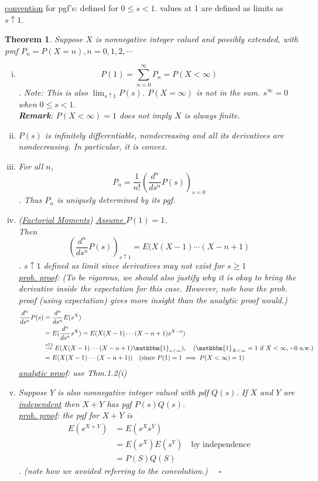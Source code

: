 \documentclass[12pt]{article}
\theoremstyle{definition}
\theoremstyle{plain}
\newtheorem{mythm}{Theorem}[section]
\begin{document}
\underline{convention} for pgf's: defined for $0 \leq s < 1$. values at 1 are defined as limits as $s \uparrow 1$.
\begin{mythm}
Suppose $X$ is nonnegative integer valued and possibly extended, with pmf $P_n = P(X=n),n=0,1,2,\cdots$
\begin{enumerate}[(i)]
\item \[P(1) = \sum_{n=0}^\infty P_n = P(X < \infty)\]. Note: This is also $\lim_{s \uparrow 1}P(s)$. $P(X = \infty)$ is not in the sum. $s^\infty = 0$ when $0 \leq s < 1$. \\
\textbf{Remark}: $P(X < \infty)=1$ does not imply $X$ is always finite.
\item $P(s)$ is infinitely differentiable, nondecreasing and all its derivatives are nondecreasing. In particular, it is convex.
\item For all $n$, \[P_n = \frac{1}{n!}(\frac{d^n}{ds^n}P(s))_{s=0}\]. Thus $P_n$ is uniquely determined by its pgf.
\item (\underline{Factorial Moments}) \underline{\underline{Assume $P(1)=1$}}. \\
Then \[(\frac{d^n}{ds^n}P(s))_{s\uparrow 1} = E(X(X-1)\cdots(X-n+1)\]. $s \uparrow 1$ defined as limit since derivatives may not exist for $s \geq 1$ \\
\underline{prob. proof}: (To be rigorous, we should also justify why it is okay to bring the derivative inside the expectation for this case. However, note how the prob. proof (using expectation) gives more insight than the analytic proof would.)
\begin{displaymath}
\begin{aligned}
\frac{d^n}{ds^n} P(s) &= \frac{d^n}{ds^n} E(s^X) \\
		&= E(\frac{d^n}{ds^n}s^X) = E(X(X-1)\cdots(X-n+1)s^{X-n}) \\
		&\stackrel{s\uparrow 1}{\rightarrow} E(X(X-1)\cdots(X-n+1)\mathbbm{1}_{x < \infty}),\quad \mbox{($\mathbbm{1}_{X < \infty} =1$ if $X < \infty, -0$ o.w.)} \\
		&=E(X(X-1)\cdots(X-n+1)) \quad \mbox{(since $P(1)=1 \implies P(X < \infty)=1$)}\\
\end{aligned}
\end{displaymath}
\underline{analytic proof}: use Thm.1.2(i)
\item Suppose $Y$ is also nonnegative integer valued with pdf $Q(s)$. If $X$ and $Y$ are \underline{\underline{independent}} then $X+Y$ has pgf $P(s)Q(s)$.\\
\underline{prob. proof}: the pgf for $X+Y$ is
\begin{displaymath}
\begin{aligned}
E(s^{X+Y}) &= E(s^Xs^Y)\\
	&= E(s^X)E(s^Y) \quad \mbox{by independence} \\
	&= P(S)Q(S) 
\end{aligned}
\end{displaymath}. (note how we avoided referring to the convolution.) $\quad\square$
\end{enumerate}
\end{mythm}
\end{document}
